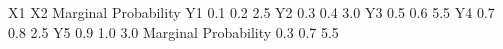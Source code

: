                       X1                      X2 Marginal Probability
Y1                   0.1 0.2                  2.5
Y2                   0.3 0.4                  3.0
Y3                   0.5 0.6                  5.5
Y4                   0.7 0.8                  2.5
Y5                   0.9 1.0                  3.0
Marginal Probability 0.3 0.7                  5.5
